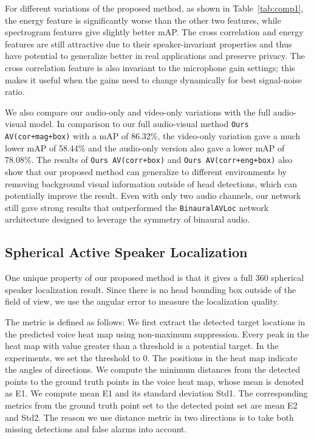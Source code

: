 \documentclass[10pt,twocolumn,letterpaper]{article}
\begin{document}
For different variations of the proposed method, as shown in Table~\ref{tab:comp1}, the energy feature is significantly worse than the other two features, 
while spectrogram features give slightly better mAP. 
The cross correlation and energy features are still attractive due to their speaker-invariant 
properties and thus have potential to generalize better in real applications and preserve privacy. 
The cross correlation feature is also invariant to the microphone gain settings;
this makes it useful when the gains need to change dynamically for best signal-noise ratio.

We also compare our audio-only and video-only variations with the full audio-visual model.
In comparison to our full audio-visual method \texttt{Ours AV(cor+mag+box)} with a mAP of 86.32\%, 
the video-only variation gave a much lower mAP of 58.44\% and the 
audio-only version also gave a lower mAP of 78.08\%. 
The results of \texttt{Ours AV(corr+box)} and  \texttt{Ours AV(corr+eng+box)} also show that our proposed method
can generalize to different environments by removing background visual information outside of head detections,
which can potentially 
improve the result.
Even with only two audio channels, our network still gave strong results that outperformed the \texttt{BinauralAVLoc}
network architecture designed to leverage the symmetry of binaural audio.  


\subsection{Spherical Active Speaker Localization} 

One unique property of our proposed method is that it gives a full 360 spherical speaker localization result. 
Since there is no head bounding box outside of the field of view, we use the angular error to 
measure the localization quality. 

The metric is defined as follows:
We first extract the detected target locations in the predicted voice heat map using non-maximum suppression. Every peak in the heat map with value greater than a threshold is a potential target. 
In the experiments, we set the threshold to 0.
The positions in the heat map indicate the angles of directions.
We compute the minimum distances from the detected points to the ground truth points in the voice heat map, 
whose mean is denoted as E1. We compute mean E1 and its standard deviation
Std1. The corresponding metrics from the ground truth point set to the detected point set are mean E2 and Std2. 
The reason we use distance metric in two directions is to take both missing detections and false alarms into account.
\end{document}
